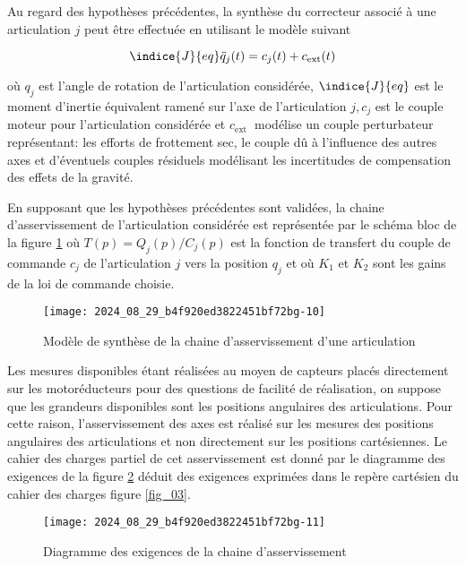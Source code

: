 \ifprof
\else
Au regard des hypothèses précédentes, la synthèse du correcteur associé à une articulation $j$ peut être effectuée en utilisant le modèle suivant

$$
\indice{J}{eq} \ddot{q}_{j}(t)=c_{j}(t)+c_{\mathrm{ext}}(t)
$$

où $q_{j}$ est l'angle de rotation de l'articulation considérée, $\indice{J}{eq}$ est le moment d'inertie équivalent ramené sur l'axe de l'articulation $j, c_{j}$ est le couple moteur pour l'articulation considérée et $c_{\text {ext }}$ modélise un couple perturbateur représentant: les efforts de frottement sec, le couple dû à l'influence des autres axes et d'éventuels couples résiduels modélisant les incertitudes de compensation des effets de la gravité.

En supposant que les hypothèses précédentes sont validées, la chaine d'asservissement de l'articulation considérée est représentée par le schéma bloc de la figure \ref{fig_11} où $T(p)=Q_{j}(p) / C_{j}(p)$ est la fonction de transfert du couple de commande $c_{j}$ de l'articulation $j$ vers la position $q_{j}$ et où $K_{1}$ et $K_{2}$ sont les gains de la loi de commande choisie.

\begin{figure}[!h]
\centering
\texttt{[image: 2024\_08\_29\_b4f920ed3822451bf72bg-10]}
\caption{\label{fig_11}Modèle de synthèse de la chaine d'asservissement d'une articulation}
\end{figure}

Les mesures disponibles étant réalisées au moyen de capteurs placés directement sur les motoréducteurs pour des questions de facilité de réalisation, on suppose que les grandeurs disponibles sont les positions angulaires des articulations. Pour cette raison, l'asservissement des axes est réalisé sur les mesures des positions angulaires des articulations et non directement sur les positions cartésiennes. Le cahier des charges partiel de cet asservissement est donné par le diagramme des exigences de la figure \ref{fig_12} déduit des exigences exprimées dans le repère cartésien du cahier des charges figure \ref{fig_03}.

\begin{figure}[!h]
\centering
\texttt{[image: 2024\_08\_29\_b4f920ed3822451bf72bg-11]}
\caption{\label{fig_12}Diagramme des exigences de la chaine d'asservissement}
\end{figure}
\fi

